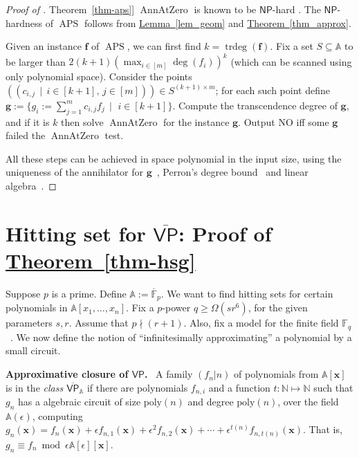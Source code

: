 \documentclass[11pt]{article}
\numberwithin{equation}{section}
\theoremstyle{definition}
\theoremstyle{plain}
\newcommand{\cclass}[1]{\textsf{#1}}
\newcommand{\expref}[2]{\hyperref[#2]{#1~\ref{#2}}}
\newcommand{\F}{\mathbb{F}}
\newcommand{\aff}{\mathbb{A}}
\DeclareMathOperator{\trdeg}{\mathrm{trdeg}}
\newcommand{\ol}[1]{\overline{#1}}
\newcommand{\NP}{\cclass{NP}\xspace}  %
\newcommand{\VP}{\cclass{VP}\xspace}  %
\newcommand{\VPbar}{\overline{\VP}\xspace}  %
\DeclareMathOperator{\APS}{\mathrm{APS}\xspace} %
\DeclareMathOperator{\AnnAtZero}{\mathrm{AnnAtZero}\xspace} %
\begin{document}
%
%
\begin{proof}[Proof of \expref{Theorem}{thm-aps}]
$\AnnAtZero$ is known to be $\NP$-hard \cite{Kay09}. The $\NP$-hardness of $\APS$ follows from \expref{Lemma}{lem_geom} and \expref{Theorem}{thm_approx}.

Given an instance $\mathbf f$ of $\APS$, we can first find $k=\trdeg(\mathbf f)$. Fix a 
%
set %
$S\subseteq \aff$ to be larger than $2(k+1)(\max_{i\in [m]}\deg(f_i))^k$ (which can be scanned using only 
%
polynomial space). %
Consider the points $\left(\left(c_{i,j} \,\mid\, i\in [k+1],\, j\in [m] \right)\right)\in S^{(k+1)\times m}$; for each such point define $\mathbf g:= \big\{g_i:= \sum_{j=1}^m c_{i,j} f_j \,\mid$ $i\in[k+1] \big\}$.   
Compute the transcendence degree of $\mathbf g$, and if it is $k$ then solve $\AnnAtZero$ for the instance $\mathbf g$. 
Output NO iff some $\mathbf g$ failed the $\AnnAtZero$ test.

All these steps can be achieved in space polynomial in the input size, using the uniqueness of the annihilator for $\mathbf g$~\cite[Theorem~47]{Mat80}, Perron's degree bound~\cite{Plo05} and linear algebra~\cite{C76, BGH82, Mul87}.
\end{proof}
%
%
\section{Hitting set for \texorpdfstring{$\VPbar$}{VPbar}: Proof of \expref{Theorem}{thm-hsg}} \label{sec-hsg}

Suppose $p$ is a prime. Define $\aff:=\ol{\F}_p$. We want to find hitting sets for certain polynomials in $\aff[x_1,\dots,x_n]$. Fix a $p$-power $q\ge\Omega(sr^6)$, for the given parameters $s, r$. Assume that $p\nmid(r+1)$. Also, fix a model for the finite field $\F_q$~\cite{AL86}. We now define the notion of ``infinitesimally approximating'' a polynomial by a small circuit.

\smallskip\noindent
%
%
\textbf{Approximative closure of $\VP$.}~\cite{bringmann2017algebraic}
A family $(f_n|n)$ of polynomials from $\aff[\mathbf x]$ is in the \emph{class
%
%
$\VPbar_\aff$}       %
if there are polynomials $f_{n,i}$ and a function $t:\mathbb{N} \mapsto \mathbb{N}$ such that $g_n$  has a 
%
algebraic circuit of  size $\mathrm{poly}(n)$ and  degree $\mathrm{poly}(n)$, %
over the field $\aff(\epsilon)$, computing $g_n(\mathbf x)= f_n(\mathbf x)+ \epsilon f_{n,1}(\mathbf x)+ {\epsilon}^2 f_{n,2}(\mathbf x)+ \cdots+ {\epsilon}^{t(n)} f_{n,t(n)}(\mathbf x)$. That is, $g_n \equiv f_n \bmod{\epsilon\aff[\epsilon][\mathbf x]}$.
  
\end{document}
